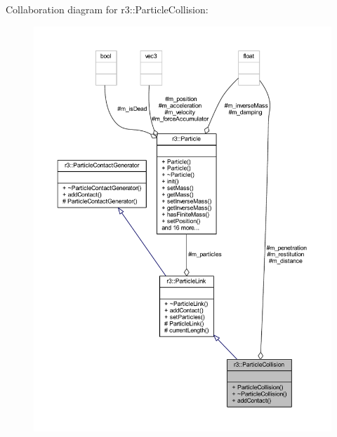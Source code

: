 Collaboration diagram for r3\+:\+:Particle\+Collision\+:\nopagebreak
\begin{figure}[H]
\begin{center}
\leavevmode
\includegraphics[width=350pt]{classr3_1_1_particle_collision__coll__graph}
\end{center}
\end{figure}
